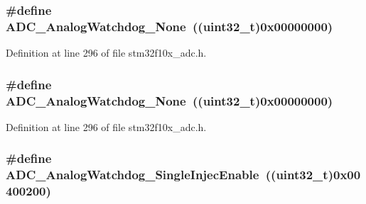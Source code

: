 \subsubsection[{\texorpdfstring{A\+D\+C\+\_\+\+Analog\+Watchdog\+\_\+\+None}{ADC_AnalogWatchdog_None}}]{\setlength{\rightskip}{0pt plus 5cm}\#define A\+D\+C\+\_\+\+Analog\+Watchdog\+\_\+\+None~(({\bf uint32\+\_\+t})0x00000000)}\hypertarget{group___a_d_c__analog__watchdog__selection_ga91f69979e0e449fef5a8b225a21e3eb9}{}\label{group___a_d_c__analog__watchdog__selection_ga91f69979e0e449fef5a8b225a21e3eb9}


Definition at line 296 of file stm32f10x\+\_\+adc.\+h.

\subsubsection[{\texorpdfstring{A\+D\+C\+\_\+\+Analog\+Watchdog\+\_\+\+None}{ADC_AnalogWatchdog_None}}]{\setlength{\rightskip}{0pt plus 5cm}\#define A\+D\+C\+\_\+\+Analog\+Watchdog\+\_\+\+None~(({\bf uint32\+\_\+t})0x00000000)}\hypertarget{group___a_d_c__analog__watchdog__selection_ga91f69979e0e449fef5a8b225a21e3eb9}{}\label{group___a_d_c__analog__watchdog__selection_ga91f69979e0e449fef5a8b225a21e3eb9}


Definition at line 296 of file stm32f10x\+\_\+adc.\+h.

\subsubsection[{\texorpdfstring{A\+D\+C\+\_\+\+Analog\+Watchdog\+\_\+\+Single\+Injec\+Enable}{ADC_AnalogWatchdog_SingleInjecEnable}}]{\setlength{\rightskip}{0pt plus 5cm}\#define A\+D\+C\+\_\+\+Analog\+Watchdog\+\_\+\+Single\+Injec\+Enable~(({\bf uint32\+\_\+t})0x00400200)}\hypertarget{group___a_d_c__analog__watchdog__selection_gaa9904271617ab69593ac68ae540047fb}{}\label{group___a_d_c__analog__watchdog__selection_gaa9904271617ab69593ac68ae540047fb}


